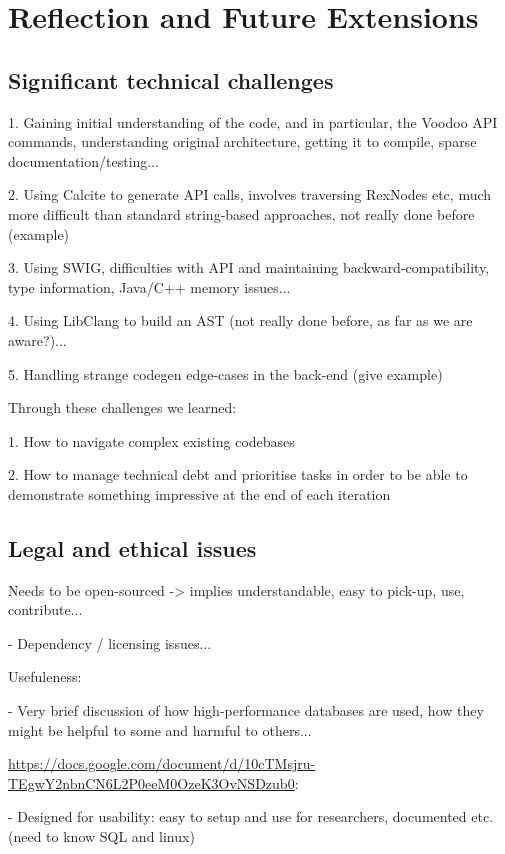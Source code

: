 \chapter{Reflection and Future Extensions}

\section{Significant technical challenges}

1. Gaining initial understanding of the code, and in particular, the Voodoo API commands, understanding original architecture, getting it to compile, sparse documentation/testing...

2. Using Calcite to generate API calls, involves traversing RexNodes etc, much more difficult than standard string-based approaches, not really done before (example)

3. Using SWIG, difficulties with API and maintaining backward-compatibility, type information, Java/C++ memory issues...

4. Using LibClang to build an AST (not really done before, as far as we are aware?)...

5. Handling strange codegen edge-cases in the back-end (give example)

Through these challenges we learned:

1. How to navigate complex existing codebases

2. How to manage technical debt and prioritise tasks in order to be able to demonstrate something impressive at the end of each iteration

\section{Legal and ethical issues}

Needs to be open-sourced -> implies understandable, easy to pick-up, use, contribute...

- Dependency / licensing issues...

Usefuleness:

- Very brief discussion of how high-performance databases are used, how they might be helpful to some and harmful to others...

\url{https://docs.google.com/document/d/10cTMsjru-TEgwY2nbnCN6L2P0eeM0OzeK3OvNSDzub0}:

- Designed for usability: easy to setup and use for researchers, documented etc. (need to know SQL and linux)

